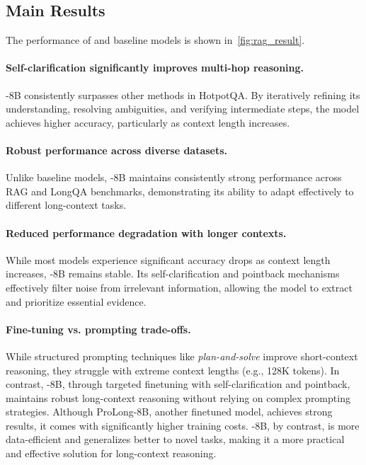 \subsection{Main Results}

The performance of \method and baseline models is shown in~\cref{fig:rag_result}. 


\paragraph{Self-clarification significantly improves multi-hop reasoning.} \method-8B consistently surpasses other methods in HotpotQA. By iteratively refining its understanding, resolving ambiguities, and verifying intermediate steps, the model achieves higher accuracy, particularly as context length increases.

\paragraph{Robust performance across diverse datasets.} Unlike baseline models, \method-8B maintains consistently strong performance across RAG and LongQA benchmarks, demonstrating its ability to adapt effectively to different long-context tasks.

\paragraph{Reduced performance degradation with longer contexts.} While most models experience significant accuracy drops as context length increases, \method-8B remains stable. Its self-clarification and pointback mechanisms effectively filter noise from irrelevant information, allowing the model to extract and prioritize essential evidence.


\paragraph{Fine-tuning vs. prompting trade-offs.} While structured prompting techniques like \textit{plan-and-solve} improve short-context reasoning, they struggle with extreme context lengths (e.g., 128K tokens). In contrast, \method-8B, through targeted finetuning with self-clarification and pointback, maintains robust long-context reasoning without relying on complex prompting strategies. Although ProLong-8B, another finetuned model, achieves strong results, it comes with significantly higher training costs. \method-8B, by contrast, is more data-efficient and generalizes better to novel tasks, making it a more practical and effective solution for long-context reasoning.

